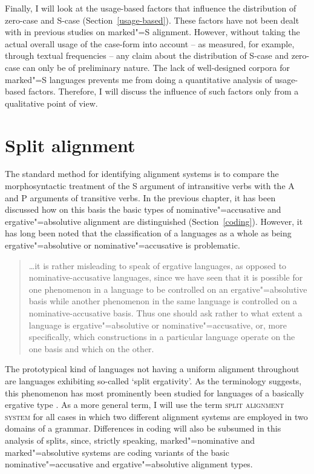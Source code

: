 Finally, I will look at the usage-based factors that influence the distribution of zero-case and S-case (Section~\ref{usage-based}). 
These factors have not been dealt with in previous studies on marked"=S alignment.  
However, without taking the actual overall usage of the case-form into account -- as measured, for example,  through textual frequencies -- any claim about the distribution of S-case and zero-case can only be of preliminary nature. 
The lack of well-designed corpora for marked"=S languages prevents me from doing a quantitative analysis of usage-based factors. 
Therefore, I will discuss the influence of such factors only from a qualitative point of view. 


\section{Split alignment}\label{grammar-based}

The standard method for identifying alignment systems is to compare the morphosyntactic treatment of the S argument of intransitive verbs with the A and P arguments of transitive verbs. 
In the previous chapter, it has been discussed how on this basis the basic types of nominative"=accusative and ergative"=absolutive alignment are distinguished (Section~\ref{coding}). However, it has long been noted that the classification of a languages as a whole as being ergative"=absolutive or nominative"=accusative is problematic.   

\begin{quote}
\dots it is rather misleading to speak of ergative languages, as opposed to no\-mi\-na\-tive-ac\-cu\-sa\-tive languages, since we have seen that it is possible for one phenomenon in a language to be controlled on an ergative"=absolutive basis while another phenomenon in the same language is controlled on a no\-mi\-na\-tive-accusative basis. Thus one should ask rather to what extent a language is ergative"=absolutive or nominative"=accusative, or, more specifically, which constructions in a particular language operate on the one basis and which on the other.
\citep[350--351]{Comrie:1978}
\end{quote}

The prototypical kind of languages not having a uniform alignment throughout are languages exhibiting so-called `split ergativity'. 
As the terminology suggests, this phenomenon has most prominently been studied for languages of a basically ergative type \citep[cf.][]{Silverstein:1976, Dixon:1994}. 
As a more general term, I will use the term \textsc{split alignment system} for all cases in which two different alignment systems are employed in two domains of a grammar. 
Differences in coding will also be subsumed in this analysis of splits, since, strictly speaking, marked"=nominative and marked"=absolutive systems are coding variants of the basic nominative"=accusative and ergative"=absolutive alignment types.

